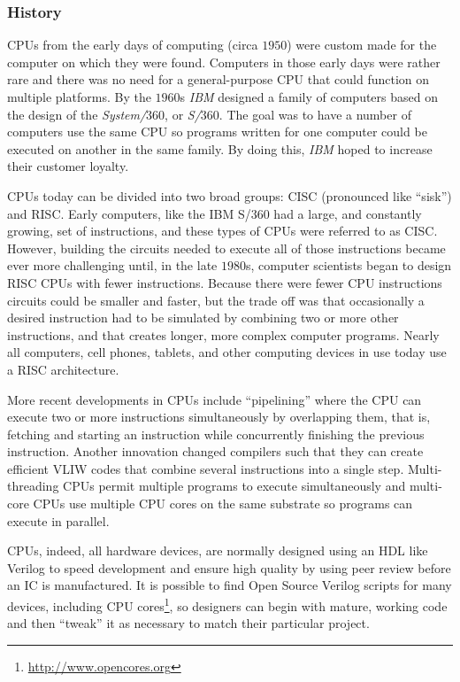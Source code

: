 \subsubsection{History}

\acp{CPU} from the early days of computing (circa $ 1950 $) were custom made for the computer on which they were found. Computers in those early days were rather rare and there was no need for a general-purpose \ac{CPU} that could function on multiple platforms. By the $ 1960 $s \emph{IBM} designed a family of computers based on the design of the \emph{System/$ 360 $}, or \emph{S/$ 360 $}. The goal was to have a number of computers use the same \ac{CPU} so programs written for one computer could be executed on another in the same family. By doing this, \emph{IBM} hoped to increase their customer loyalty.

\acp{CPU} today can be divided into two broad groups: \ac{CISC} (pronounced like ``sisk'') and \ac{RISC}. Early computers, like the IBM S/$ 360 $ had a large, and constantly growing, set of instructions, and these types of \acp{CPU} were referred to as \ac{CISC}. However, building the circuits needed to execute all of those instructions became ever more challenging until, in the late $ 1980 $s, computer scientists began to design \ac{RISC} \acp{CPU} with fewer instructions. Because there were fewer \ac{CPU} instructions circuits could be smaller and faster, but the trade off was that occasionally a desired instruction had to be simulated by combining two or more other instructions, and that creates longer, more complex computer programs. Nearly all computers, cell phones, tablets, and other computing devices in use today use a \ac{RISC} architecture.

More recent developments in \acp{CPU} include ``pipelining'' where the \ac{CPU} can execute two or more instructions simultaneously by overlapping them, that is, fetching and starting an instruction while concurrently finishing the previous instruction. Another innovation changed compilers such that they can create efficient \ac{VLIW} codes that combine several instructions into a single step. Multi-threading \acp{CPU} permit multiple programs to execute simultaneously and multi-core \acp{CPU} use multiple \ac{CPU} cores on the same substrate so programs can execute in parallel. 

\acp{CPU}, indeed, all hardware devices, are normally designed using an \ac{HDL} like Verilog to speed development and ensure high quality by using peer review before an \ac{IC} is manufactured. It is possible to find Open Source Verilog scripts for many devices, including \ac{CPU} cores\footnote{\url{http://www.opencores.org}}, so designers can begin with mature, working code and then ``tweak'' it as necessary to match their particular project.

